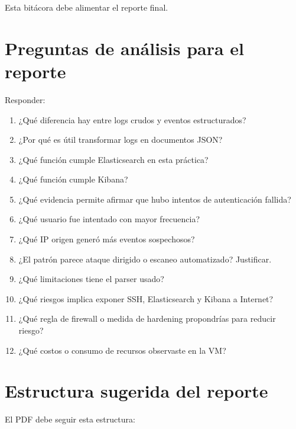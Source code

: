 \documentclass[
  coursetitle={Cómputo Nube y Tecnologías Emergentes},
  coursehours={96},
  coursedate={Verano 2026},
  doctype={Práctica},
  otherlangs={english,french},
  authorname={Lázaro},
  authorsurname={Bustio-Martínez},
  authortitle={PhD},
  role={Profesor Investigador},
  email={lbustio@inaoe.mx},
  phone={5559504000},
  ext={7459},
  institution={Instituto Nacional de Astrofísica, Óptica y Electrónica (INAOE)},
  department={Maestría en Ciencias en Tecnologías de Seguridad},
  address={Luis Enrique Erro 1, Sta. Ma. Tonantzintla, San Andrés Cholula, CP 72840, Puebla, México},
  margin={0.5in}
]{../../lbustio_lecture_notes}
\begin{document}
Esta bitácora debe alimentar el reporte final.

\section{Preguntas de análisis para el reporte}

Responder:

\begin{enumerate}
    \item ¿Qué diferencia hay entre logs crudos y eventos estructurados?
    \item ¿Por qué es útil transformar logs en documentos JSON?
    \item ¿Qué función cumple Elasticsearch en esta práctica?
    \item ¿Qué función cumple Kibana?
    \item ¿Qué evidencia permite afirmar que hubo intentos de autenticación fallida?
    \item ¿Qué usuario fue intentado con mayor frecuencia?
    \item ¿Qué IP origen generó más eventos sospechosos?
    \item ¿El patrón parece ataque dirigido o escaneo automatizado? Justificar.
    \item ¿Qué limitaciones tiene el parser usado?
    \item ¿Qué riesgos implica exponer SSH, Elasticsearch y Kibana a Internet?
    \item ¿Qué regla de firewall o medida de hardening propondrías para reducir riesgo?
    \item ¿Qué costos o consumo de recursos observaste en la VM?
\end{enumerate}

\section{Estructura sugerida del reporte}

El PDF debe seguir esta estructura:
\end{document}
